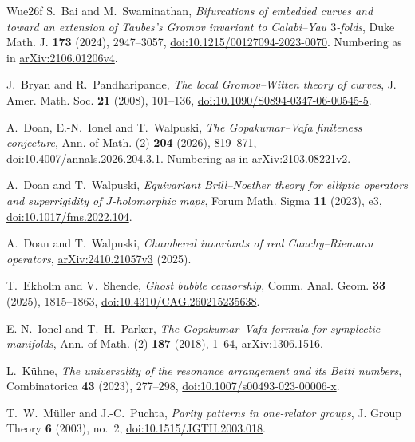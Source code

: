 \begin{thebibliography}{Wue26f}
 S.~Bai and M.~Swaminathan,
\emph{Bifurcations of embedded curves and toward an extension of Taubes's
Gromov invariant to Calabi--Yau $3$-folds}, Duke Math. J. \textbf{173}
(2024), 2947--3057,
\href{https://doi.org/10.1215/00127094-2023-0070}{doi:10.1215/00127094-2023-0070}.
Numbering as in \href{https://arxiv.org/abs/2106.01206v4}{arXiv:2106.01206v4}.

 J.~Bryan and R.~Pandharipande,
\emph{The local Gromov--Witten theory of curves}, J. Amer. Math. Soc.
\textbf{21} (2008), 101--136,
\href{https://doi.org/10.1090/S0894-0347-06-00545-5}{doi:10.1090/S0894-0347-06-00545-5}.

 A.~Doan, E.-N.~Ionel and T.~Walpuski,
\emph{The Gopakumar--Vafa finiteness conjecture},
Ann. of Math. (2) \textbf{204} (2026), 819--871,
\href{https://doi.org/10.4007/annals.2026.204.3.1}{doi:10.4007/annals.2026.204.3.1}.
Numbering as in \href{https://arxiv.org/abs/2103.08221v2}{arXiv:2103.08221v2}.

 A.~Doan and T.~Walpuski,
\emph{Equivariant Brill--Noether theory for elliptic operators and superrigidity of
$J$-holomorphic maps}, Forum Math. Sigma \textbf{11} (2023), e3,
\href{https://doi.org/10.1017/fms.2022.104}{doi:10.1017/fms.2022.104}.

 A.~Doan and T.~Walpuski,
\emph{Chambered invariants of real Cauchy--Riemann operators},
\href{https://arxiv.org/abs/2410.21057v3}{arXiv:2410.21057v3} (2025).

 T.~Ekholm and V.~Shende,
\emph{Ghost bubble censorship}, Comm. Anal. Geom. \textbf{33}
(2025), 1815--1863,
\href{https://doi.org/10.4310/CAG.260215235638}{doi:10.4310/CAG.260215235638}.

 E.-N.~Ionel and T.~H.~Parker,
\emph{The Gopakumar--Vafa formula for symplectic manifolds},
Ann. of Math. (2) \textbf{187} (2018), 1--64,
\href{https://arxiv.org/abs/1306.1516}{arXiv:1306.1516}.

 L.~K\"uhne,
\emph{The universality of the resonance arrangement and its Betti numbers},
Combinatorica \textbf{43} (2023), 277--298,
\href{https://doi.org/10.1007/s00493-023-00006-x}{doi:10.1007/s00493-023-00006-x}.

 T.~W.~M\"uller and J.-C.~Puchta, \emph{Parity patterns in one-relator groups}, J. Group Theory \textbf{6} (2003), no.~2, \href{https://doi.org/10.1515/JGTH.2003.018}{doi:10.1515/JGTH.2003.018}.


\end{thebibliography}
